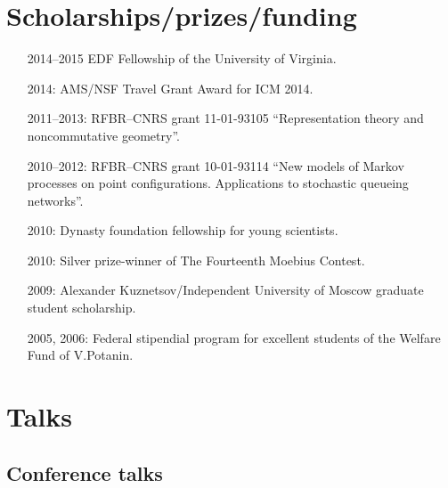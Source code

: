 \documentclass[letterpaper,11pt]{article}
\begin{document}
\section*{Scholarships/prizes/funding}
\begin{itemize}
  \item[2014--2015] EDF Fellowship of the University of Virginia. 

  \item[2014:] AMS/NSF Travel Grant Award for ICM 2014.

  \item[2011--2013:] RFBR--CNRS grant 11-01-93105 ``Representation theory and noncommutative geometry''.
  
  \item[2010--2012:] RFBR--CNRS grant 10-01-93114 ``New models of Markov processes on point configurations. Applications to stochastic queueing networks''.

  \item[2010:] Dynasty foundation fellowship for young scientists.
    
  \item[2010:] Silver prize-winner of The Fourteenth Moebius Contest.

  \item[2009:] Alexander Kuznetsov/Independent University of Moscow graduate student scholarship.

  \item[2005, 2006:] Federal stipendial program for excellent students of the Welfare Fund of V.Potanin.
\end{itemize}

\section*{Talks}

\subsection*{Conference talks}
\end{document}
